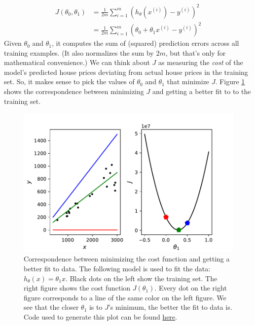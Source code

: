 \documentclass{article}
\theoremstyle{definition}
\begin{document}
\begin{align}
    J(\theta_0, \theta_1) &= \frac{1}{2m}\sum_{i=1}^{m}(h_{\theta}(x^{(i)}) - y^{(i)})^2
    \label{linreg-eq:costfunc}\\
    &= \frac{1}{2m}\sum_{i=1}^{m}(\theta_0 + \theta_1 x^{(i)} - y^{(i)})^2
    \label{linreg-eq:univar-costfunc}
\end{align}
Given $\theta_0$ and $\theta_1$, it computes the sum of (squared) prediction errors across all training examples. (It also normalizes the sum by $2m$, but that's only for mathematical convenience.) We can think about $J$ as measuring the \textit{cost} of the model's predicted house prices deviating from actual house prices in the training set. So, it makes sense to pick the values of $\theta_0$ and $\theta_1$ that minimize $J$. Figure \ref{linreg-fig:costfunc} shows the correspondence between minimizing $J$ and getting a better fit to to the training set. 

\begin{figure}[ht]
\centering
\includegraphics[scale=0.7]{images/lin_reg/costfunc.pdf}
\caption{Correspondence between minimizing the cost function and getting a better fit to data. The following model is used to fit the data: $h_{\theta}(x) = \theta_1 x$. Black dots on the left show the training set. The right figure shows the cost function $J(\theta_1)$. Every dot on the right figure corresponds to a line of the same color on the left figure. We see that the closer $\theta_1$ is to $J$'s minimum, the better the fit to data is. Code used to generate this plot can be found \href{https://github.com/siavashaslanbeigi/ml_notes_supp/blob/master/lin_reg/costfunction.ipynb}{here}.}
\label{linreg-fig:costfunc}
\end{figure}
\end{document}
